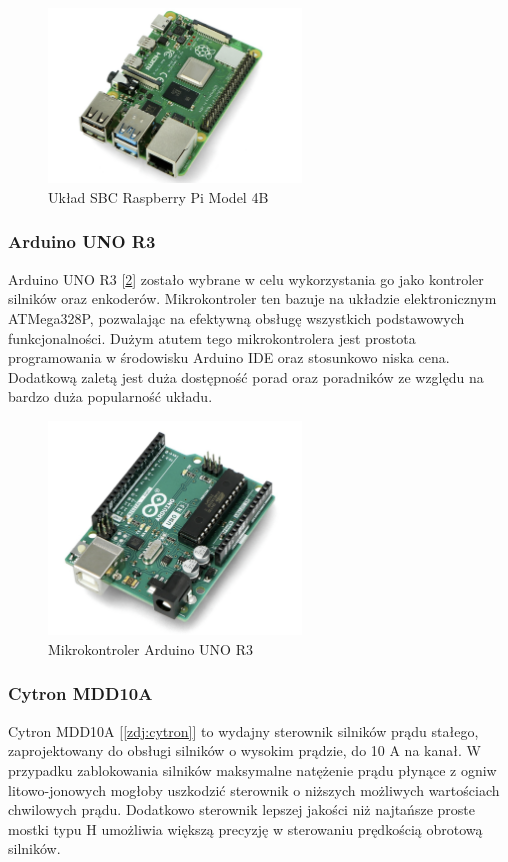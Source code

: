 \begin{figure}[H]
    \centering
    \includegraphics[width=0.6\textwidth]{./graf/raspi-4b.png}
    \caption{Układ SBC Raspberry Pi Model 4B}
    \label{zdj:raspi}
\end{figure}

\subsubsection*{Arduino UNO R3}
Arduino UNO R3 [\ref{zdj:arduino-r3}] zostało wybrane w celu wykorzystania go jako kontroler silników oraz enkoderów. Mikrokontroler ten bazuje na układzie elektronicznym ATMega328P, pozwalając na efektywną obsługę wszystkich podstawowych funkcjonalności. Dużym atutem tego mikrokontrolera jest prostota programowania w środowisku Arduino IDE oraz stosunkowo niska cena. Dodatkową zaletą jest duża dostępność porad oraz poradników ze względu na bardzo duża popularność układu. 

\begin{figure}[H]
        \centering
        \includegraphics[width=0.6\textwidth]{./graf/arduino-r3.png}
        \caption{Mikrokontroler Arduino UNO R3}
        \label{zdj:arduino-r3}
\end{figure}

\subsubsection*{Cytron MDD10A}
Cytron MDD10A [\ref{zdj:cytron}] to wydajny sterownik silników prądu stałego, zaprojektowany do obsługi silników o wysokim prądzie, do 10 A na kanał. W przypadku zablokowania silników maksymalne natężenie prądu płynące z ogniw litowo-jonowych mogłoby uszkodzić sterownik o niższych możliwych wartościach chwilowych prądu. Dodatkowo sterownik lepszej jakości niż najtańsze proste mostki typu H umożliwia większą precyzję w sterowaniu prędkością obrotową silników. 


